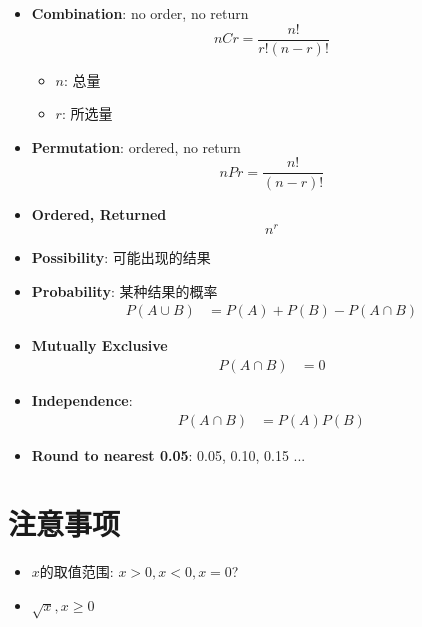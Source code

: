 \begin{multicols}{2}
\begin{itemize}
    \item \textbf{Combination}: no order, no return
    \begin{equation}
      n C r = \frac{n!}{r! \left( n - r \right)!}
    \end{equation}
    \begin{itemize}
      \item $ n $: 总量
      \item $ r $: 所选量
    \end{itemize}

    \item \textbf{Permutation}: ordered, no return
    \begin{equation}
      n P r = \frac{n!}{\left( n - r \right)!}
    \end{equation}

    \item \textbf{Ordered, Returned}
    \begin{equation}
      n^{r}
    \end{equation}

    \item \textbf{Possibility}: 可能出现的结果
    \item \textbf{Probability}: 某种结果的概率
    \begin{align}
      P\left( A \cup B \right) &= P\left( A \right) + P\left( B \right) - P\left( A \cap B \right)
    \end{align}

    \item \textbf{Mutually Exclusive}
    \begin{align}
      P\left( A \cap B \right) &= 0
    \end{align}

    \item \textbf{Independence}:
    \begin{align}
      P\left( A \cap B \right) &= P\left( A \right) P\left( B \right)
    \end{align}

    \item \textbf{Round to nearest 0.05}: 0.05, 0.10, 0.15 ...
  \end{itemize}
\end{multicols}

\section{注意事项}

  \begin{itemize}
    \item $ x $的取值范围: $ x > 0, x < 0, x = 0 $?
    \item $ \sqrt{x}, x \ge 0 $
  \end{itemize}

